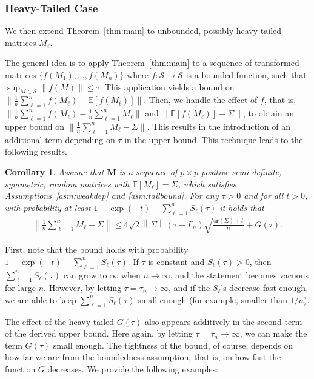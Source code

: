 \documentclass[11pt,a4paper]{article}
\newtheorem{corollary}[theorem]{Corollary}
\theoremstyle{remark}
\theoremstyle{definition}
\theoremstyle{definition}
\newcommand{\mS}{\mathcal{S}}
\newcommand{\Ep}{\mathbb{E}}
\newcommand{\Surv}{S}
\newcommand{\rc}{\color{black}}
\begin{document}
\begin{bibunit}[apalike]
\subsubsection{Heavy-Tailed Case}

We then extend Theorem~\ref{thm:main} to unbounded, possibly heavy-tailed matrices $M_\ell$.

The general idea is to apply Theorem~\ref{thm:main} to a sequence of transformed matrices $\{f(M_1),\ldots,f(M_n)\}$ where $f:\mathcal{S}\rightarrow\mathcal{S}$ is a bounded function, such that  $\sup_{ M \in \mS}\|f(M)\|\leq \tau$.
This application yields a bound on $\| \frac{1}{n}\sum_{\ell=1}^n f(M_\ell) - \mathbb{E}[f(M_\ell)] \|$. Then, we handle the effect of $f$, that is, $\| \frac{1}{n}\sum_{\ell=1}^n f(M_\ell) - \frac{1}{n}\sum_{\ell=1}^n M_\ell\|$ and $\| \mathbb{E}[f(M_\ell)] - \Sigma \|$, to obtain an upper bound on $\|\frac{1}{n}\sum_{\ell=1}^{n} M_{\ell}-\Sigma\|$.
This results in the introduction of an additional term depending on $\tau$ in the upper bound. 
This technique leads to the following results.
\begin{corollary} \label{cor:standard}
Assume that $\mathbf{M}$ is a sequence of $p \times p$ {\rc positive semi-definite}, symmetric, random matrices with $\Ep\left[M_{\ell}\right]=\Sigma$, which satisfies Assumptions~\ref{asm:weakdep} and \ref{asm:tailbound}. 
For any $\tau>0$ and for all $t>0$, with probability at least $1-\exp(-t)-\sum_{\ell=1}^n \Surv_\ell(\tau)$ it holds that
\begin{align*}
    \left\|\frac{1}{n}\sum_{\ell=1}^{n} M_{\ell}-\Sigma\right\|\le{4}\sqrt{2}\left\|\Sigma\right\|\left({\tau+\Gamma_{n}}\right)\sqrt{\frac{4\mathbf{r}\left(\Sigma\right)+t}{n}} + G(\tau).
\end{align*}
\end{corollary}

First, note that the bound holds with probability $1-\exp(-t)-\sum_{\ell=1}^n \Surv_\ell(\tau)$. If $\tau$ is constant and $\Surv_\ell(\tau)>0$, then $\sum_{\ell=1}^n \Surv_\ell(\tau)$ can grow to $\infty$ when $n\rightarrow\infty$, and the statement becomes vacuous for large $n$. However, by letting $\tau=\tau_n \rightarrow\infty$, and if the $\Surv_\ell$'s decrease fast enough, we are able to keep $\sum_{\ell=1}^n \Surv_\ell(\tau) $ small enough (for example, smaller than $1/n$).


The effect of the {\rc heavy-tailed} $G(\tau)$ also appears additively in the second term of the derived upper bound. Here again, by letting $\tau=\tau_n \rightarrow\infty$, we can make the term $G(\tau)$ small enough.
The tightness of the bound, of course, depends on how far we are from the boundedness assumption, that is, on how fast the function $G$ decreases.
We provide the following examples:



\end{bibunit}
\end{document}
